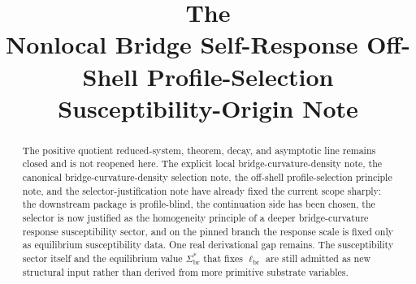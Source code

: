 \documentclass[11pt]{article}
\title{\textbf{The \TheoryName{}}\\[0.4em]
\large Nonlocal Bridge Self-Response Off-Shell Profile-Selection Susceptibility-Origin Note}
\author{}
\date{}
\newcommand{\CurvScale}{\ell_{\mathrm{br}}}
\newcommand{\RespSusEq}{\Sigma_{\mathrm{br}}^{\ast}}
\begin{document}
\maketitle

\begin{abstract}
The positive quotient reduced-system, theorem, decay, and asymptotic line remains closed and is not reopened here. The explicit local bridge-curvature-density note, the canonical bridge-curvature-density selection note, the off-shell profile-selection principle note, and the selector-justification note have already fixed the current scope sharply: the downstream package is profile-blind, the continuation side has been chosen, the selector is now justified as the homogeneity principle of a deeper bridge-curvature response susceptibility sector, and on the pinned branch the response scale is fixed only as equilibrium susceptibility data. One real derivational gap remains. The susceptibility sector itself and the equilibrium value \(\RespSusEq\) that fixes \(\CurvScale\) are still admitted as new structural input rather than derived from more primitive substrate variables.


\end{abstract}
\end{document}
